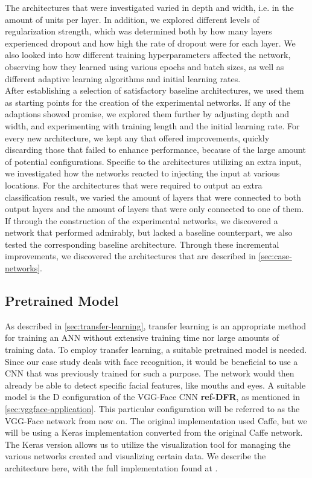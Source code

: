 \noindent The architectures that were investigated varied in depth and width, i.e. in the amount of units per layer. In addition, we explored different levels of regularization strength, which was determined both by how many layers experienced dropout and how high the rate of dropout were for each layer. We also looked into how different training hyperparameters affected the network, observing how they learned using various epochs and batch sizes, as well as different adaptive learning algorithms and initial learning rates. \\

\noindent After establishing a selection of satisfactory baseline architectures, we used them as starting points for the creation of the experimental networks. If any of the adaptions showed promise, we explored them further by adjusting depth and width, and experimenting with training length and the initial learning rate. For every new architecture, we kept any that offered improvements, quickly discarding those that failed to enhance performance, because of the large amount of potential configurations. Specific to the architectures utilizing an extra input, we investigated how the networks reacted to injecting the input at various locations. For the architectures that were required to output an extra classification result, we varied the amount of layers that were connected to both output layers and the amount of layers that were only connected to one of them. If through the construction of the experimental networks, we discovered a network that performed admirably, but lacked a baseline counterpart, we also tested the corresponding baseline architecture. Through these incremental improvements, we discovered the architectures that are described in \autoref{sec:case-networks}. 

\subsection{Pretrained Model}


As described in \autoref{sec:transfer-learning}, transfer learning is an appropriate method for training an ANN without extensive training time nor large amounts of training data. To employ transfer learning, a suitable pretrained model is needed. Since our case study deals with face recognition, it would be beneficial to use a CNN that was previously trained for such a purpose. The network would then already be able to detect specific facial features, like mouths and eyes. A suitable model is the D configuration of the VGG-Face CNN \textbf{ref-DFR}, as mentioned in \autoref{sec:vggface-application}. This particular configuration will be referred to as the VGG-Face network from now on. The original implementation used Caffe, but we will be using a Keras implementation converted from the original Caffe network. The Keras version allows us to utilize the visualization tool for managing the various networks created and visualizing certain data. We describe the architecture here, with the full implementation found at \cite{vggface-github}. \\

